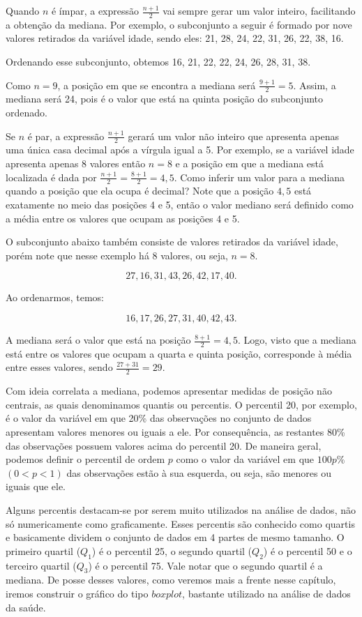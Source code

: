 \documentclass[
  letterpaper,
  DIV=11,
  numbers=noendperiod]{scrreprt}
\begin{document}
Quando \(n\) é ímpar, a expressão \(\frac{n+1}{2}\) vai sempre gerar um
valor inteiro, facilitando a obtenção da mediana. Por exemplo, o
subconjunto a seguir é formado por nove valores retirados da variável
idade, sendo eles: 21, 28, 24, 22, 31, 26, 22, 38, 16.

Ordenando esse subconjunto, obtemos 16, 21, 22, 22, 24, 26, 28, 31, 38.

Como \(n=9\), a posição em que se encontra a mediana será
\(\frac{9+1}{2}=5\). Assim, a mediana será 24, pois é o valor que está
na quinta posição do subconjunto ordenado.

Se \(n\) é par, a expressão \(\frac{n+1}{2}\) gerará um valor não
inteiro que apresenta apenas uma única casa decimal após a vírgula igual
a 5. Por exemplo, se a variável idade apresenta apenas 8 valores então
\(n = 8\) e a posição em que a mediana está localizada é dada por
\(\frac{n+1}{2} = \frac{8+1}{2} = 4,5\). Como inferir um valor para a
mediana quando a posição que ela ocupa é decimal? Note que a posição
\(4,5\) está exatamente no meio das posições 4 e 5, então o valor
mediano será definido como a média entre os valores que ocupam as
posições 4 e 5.

O subconjunto abaixo também consiste de valores retirados da variável
idade, porém note que nesse exemplo há 8 valores, ou seja, \(n=8\).

\[ 27, 16, 31, 43, 26, 42, 17, 40. \]

Ao ordenarmos, temos:

\[ 16, 17, 26, 27, 31, 40, 42, 43. \]

A mediana será o valor que está na posição \(\frac{8+1}{2} = 4,5\).
Logo, visto que a mediana está entre os valores que ocupam a quarta e
quinta posição, corresponde à média entre esses valores, sendo
\(\frac{27+31}{2}=29\).

Com ideia correlata a mediana, podemos apresentar medidas de posição não
centrais, as quais denominamos quantis ou percentis. O percentil 20, por
exemplo, é o valor da variável em que 20\% das observações no conjunto
de dados apresentam valores menores ou iguais a ele. Por consequência,
as restantes 80\% das observações possuem valores acima do percentil 20.
De maneira geral, podemos definir o percentil de ordem \(p\) como o
valor da variável em que \(100p\%\) \((0 < p < 1)\) das observações
estão à sua esquerda, ou seja, são menores ou iguais que ele.

Alguns percentis destacam-se por serem muito utilizados na análise de
dados, não só numericamente como graficamente. Esses percentis são
conhecido como quartis e basicamente dividem o conjunto de dados em 4
partes de mesmo tamanho. O primeiro quartil (\(Q_1\)) é o percentil 25,
o segundo quartil (\(Q_2\)) é o percentil 50 e o terceiro quartil
(\(Q_3\)) é o percentil 75. Vale notar que o segundo quartil é a
mediana. De posse desses valores, como veremos mais a frente nesse
capítulo, iremos construir o gráfico do tipo \(boxplot\), bastante
utilizado na análise de dados da saúde.
\end{document}
